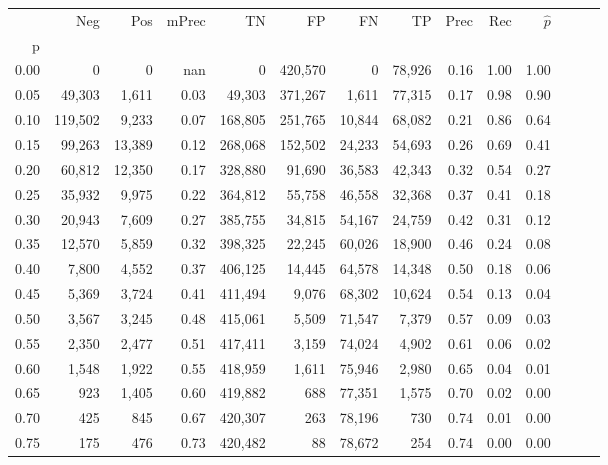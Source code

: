 \begin{tabular}{rrrrrrrrrrrrrr}
\toprule
{} &      Neg &     Pos & mPrec &       TN &       FP &      FN &      TP &  Prec &   Rec & $\hat{p}$ \\
p    &          &         &       &          &          &         &         &       &       &           \\
\midrule
0.00 &        0 &       0 &   nan &        0 &  420,570 &       0 &  78,926 &  0.16 &  1.00 &      1.00 \\
0.05 &   49,303 &   1,611 &  0.03 &   49,303 &  371,267 &   1,611 &  77,315 &  0.17 &  0.98 &      0.90 \\
0.10 &  119,502 &   9,233 &  0.07 &  168,805 &  251,765 &  10,844 &  68,082 &  0.21 &  0.86 &      0.64 \\
0.15 &   99,263 &  13,389 &  0.12 &  268,068 &  152,502 &  24,233 &  54,693 &  0.26 &  0.69 &      0.41 \\
0.20 &   60,812 &  12,350 &  0.17 &  328,880 &   91,690 &  36,583 &  42,343 &  0.32 &  0.54 &      0.27 \\
0.25 &   35,932 &   9,975 &  0.22 &  364,812 &   55,758 &  46,558 &  32,368 &  0.37 &  0.41 &      0.18 \\
0.30 &   20,943 &   7,609 &  0.27 &  385,755 &   34,815 &  54,167 &  24,759 &  0.42 &  0.31 &      0.12 \\
0.35 &   12,570 &   5,859 &  0.32 &  398,325 &   22,245 &  60,026 &  18,900 &  0.46 &  0.24 &      0.08 \\
0.40 &    7,800 &   4,552 &  0.37 &  406,125 &   14,445 &  64,578 &  14,348 &  0.50 &  0.18 &      0.06 \\
0.45 &    5,369 &   3,724 &  0.41 &  411,494 &    9,076 &  68,302 &  10,624 &  0.54 &  0.13 &      0.04 \\
0.50 &    3,567 &   3,245 &  0.48 &  415,061 &    5,509 &  71,547 &   7,379 &  0.57 &  0.09 &      0.03 \\
0.55 &    2,350 &   2,477 &  0.51 &  417,411 &    3,159 &  74,024 &   4,902 &  0.61 &  0.06 &      0.02 \\
0.60 &    1,548 &   1,922 &  0.55 &  418,959 &    1,611 &  75,946 &   2,980 &  0.65 &  0.04 &      0.01 \\
0.65 &      923 &   1,405 &  0.60 &  419,882 &      688 &  77,351 &   1,575 &  0.70 &  0.02 &      0.00 \\
0.70 &      425 &     845 &  0.67 &  420,307 &      263 &  78,196 &     730 &  0.74 &  0.01 &      0.00 \\
0.75 &      175 &     476 &  0.73 &  420,482 &       88 &  78,672 &     254 &  0.74 &  0.00 &      0.00 \\

\end{tabular}
